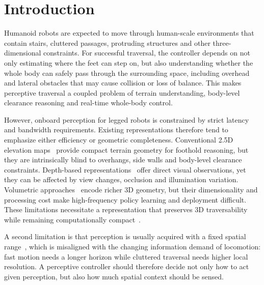 \section{Introduction}
Humanoid robots are expected to move through human-scale environments that contain stairs, cluttered passages, protruding structures and other three-dimensional constraints. For successful traversal, the controller depends on not only estimating where the feet can step on, but also understanding whether the whole body can safely pass through the surrounding space, including overhead and lateral obstacles that may cause collision or loss of balance. This makes perceptive traversal a coupled problem of terrain understanding, body-level clearance reasoning and real-time whole-body control.

However, onboard perception for legged robots is constrained by strict latency and bandwidth requirements. Existing representations therefore tend to emphasize either efficiency or geometric completeness. Conventional 2.5D elevation maps~\cite{Fankhauser2014RobotCentricElevationMapping,Fankhauser2018ProbabilisticTerrainMapping,ElevationMap_GPU_2022,long2025learning,wang2025beamdojo,ren2025vb,he2025attention,videomimic,Multi-Layer_ElevationMap_2025,Roth_2025_LearnedPerceptiveForwardDynamicsModel,Zhang_2026_AME2} provide compact terrain geometry for foothold reasoning, but they are intrinsically blind to overhangs, side walls and body-level clearance constraints. Depth-based representations~\cite{Li_2024_MOVE,zhuang2024humanoidRobot,zhuang2024humanoid,Yu_2025_START,Castillo_2025_LearningTerrainAwareBipedalLocomotion,Solano_2025_StandWalkNavigate,Sun_2025_DPL,Wang_2025_LocoMamba,zhu2026hiking} offer direct visual observations, yet they can be affected by view changes, occlusion and illumination variation. Volumetric approaches~\cite{Ben_2025_Gallant,Niijima_2025_Real-timeMulti-PlaneSegmentation,Wang_2025_Omni-Perception} encode richer 3D geometry, but their dimensionality and processing cost make high-frequency policy learning and deployment difficult. These limitations necessitate a representation that preserves 3D traversability while remaining computationally compact~\cite{2020arXiv200716100T,2018arXiv181205784L,2022arXiv220108117M}.

A second limitation is that perception is usually acquired with a fixed spatial range~\cite{Ben_2025_Gallant,Multi-Layer_ElevationMap_2025,long2025learning}, which is misaligned with the changing information demand of locomotion: fast motion needs a longer horizon while cluttered traversal needs higher local resolution. A perceptive controller should therefore decide not only how to act given perception, but also how much spatial context should be sensed.

